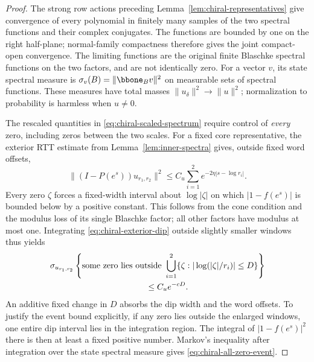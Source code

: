 \begin{proof}
The strong row actions preceding Lemma~\ref{lem:chiral-representatives}
give convergence of every polynomial in finitely many samples of the two
spectral functions and their complex conjugates. The functions are bounded
by one on the right half-plane; normal-family compactness therefore gives
the joint compact-open convergence. The limiting functions are the original
finite Blaschke spectral functions on the two factors, and are not
identically zero. For a vector $v$, its state spectral measure is
$\sigma_v(B)=\|\bbone_Bv\|^2$ on measurable sets of spectral functions.
These measures have total masses
$\|u_\delta\|^2\to\|u\|^2$; normalization to probability is harmless
when $u\ne0$.

The rescaled quantities in \eqref{eq:chiral-scaled-spectrum} require
control of \emph{every} zero, including zeros between the two scales.
For a fixed core representative, the exterior RTT estimate from
Lemma~\ref{lem:inner-spectra} gives, outside fixed word offsets,
\begin{equation}\label{eq:chiral-exterior-dip}
 \|(I-P(e^s))u_{r_1,r_2}\|^2
      \le C_u\sum_{i=1}^2e^{-2\eta|s-\log r_i|}.
\end{equation}
Every zero $\zeta$ forces a fixed-width interval about $\log|\zeta|$
on which $|1-f(e^s)|$ is bounded below by a positive constant. This
follows from the cone condition and the modulus loss of its single
Blaschke factor; all other factors have modulus at most one.
Integrating \eqref{eq:chiral-exterior-dip} outside slightly smaller
windows thus yields
\begin{equation}\label{eq:chiral-all-zero-event}
\begin{split}
 &\sigma_{u_{r_1,r_2}}
 \left\{\text{some zero lies outside }
     \bigcup_{i=1}^2\{\zeta:|\log(|\zeta|/r_i)|\le D\}\right\}\\
 &\hspace{40mm}\le C_u e^{-cD}.
\end{split}
\end{equation}
An additive fixed change in $D$ absorbs the dip width and the word offsets.
To justify the event bound explicitly, if any zero lies outside the enlarged
windows, one entire dip interval lies in the integration region. The
integral of $|1-f(e^s)|^2$ there is then at least a fixed positive number.
Markov's inequality after integration over the state spectral measure gives
\eqref{eq:chiral-all-zero-event}.


\end{proof}
